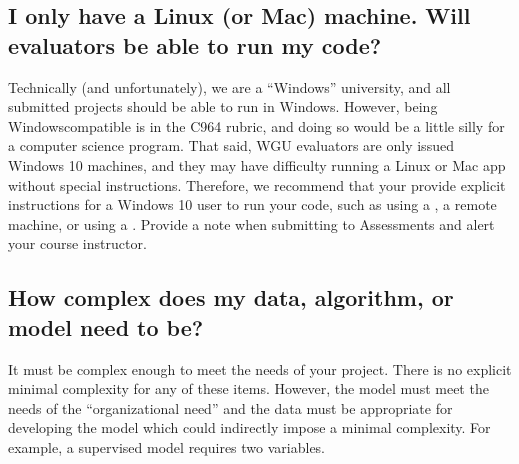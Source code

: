 \documentclass[letterpaper,10pt,english]{jupyterBook}
\begin{document}
\subsection{I only have a Linux (or Mac) machine. Will evaluators be able to run my code?}
\label{\detokenize{task2_c/task2_part_c:i-only-have-a-linux-or-mac-machine-will-evaluators-be-able-to-run-my-code}}\label{\detokenize{task2_c/task2_part_c:task2-part-c-faq-i-only-have-a-linux-or-mac-machine}}
\sphinxAtStartPar
Technically (and unfortunately), we are a “Windows” university, and all submitted projects should be able to run in Windows. However, being Windows\sphinxhyphen{}compatible is  in the C964 rubric, and doing so would be a little silly for a computer science program. That said, WGU evaluators are only issued Windows 10 machines, and they may have difficulty running a Linux or Mac app without special instructions. Therefore, we recommend that your {\hyperref[\detokenize{task2_doc/task2_doc_d:task2-doc-d-user-guide}]{}} provide explicit instructions for a Windows 10 user to run your code, such as using a , a remote machine, or using a . Provide a note when submitting to Assessments and alert your course instructor.


\subsection{How complex does my data, algorithm, or model need to be?}
\label{\detokenize{task2_c/task2_part_c:how-complex-does-my-data-algorithm-or-model-need-to-be}}
\sphinxAtStartPar
It must be complex enough to meet the needs of your project. There is no explicit minimal complexity for any of these items. However, the model must meet the needs of the “organizational need” and the data must be appropriate for developing the model which could indirectly impose a minimal complexity. For example, a supervised model requires two variables.
\end{document}
